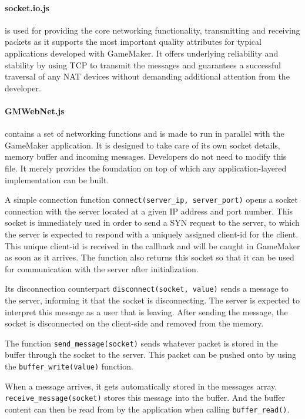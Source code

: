 \documentclass[bsc, 12pt, twoside, singlespacing, parskip, abbrevs, notimes, normalheadings, logo]{styles/infthesis}
\begin{document}
\paragraph*{socket.io.js}
is used for providing the core networking functionality, transmitting and receiving packets as it supports the most important quality attributes for typical applications developed with GameMaker. It offers underlying reliability and stability by using TCP to transmit the messages and guarantees a successful traversal of any NAT devices without demanding additional attention from the developer.

\paragraph*{GMWebNet.js}
contains a set of networking functions and is made to run in parallel with the GameMaker application. 
It is designed to take care of its own socket details, memory buffer and incoming messages. Developers do not need to modify this file. It merely provides the foundation on top of which any application-layered implementation can be built.

A simple connection function \texttt{connect(server\_ip, server\_port)} opens a socket connection with the server located at a given IP address and port number.
This socket is immediately used in order to send a SYN request to the server, to which the server is expected to respond with a uniquely assigned client-id for the client. This unique client-id is received in the callback and will be caught in GameMaker as soon as it arrives.
The function also returns this socket so that it can be used for communication with the server after initialization.

Its disconnection counterpart \texttt{disconnect(socket, value)} sends a message to the server, informing it that the socket is disconnecting. The server is expected to interpret this message as a user that is leaving.
After sending the message, the socket is disconnected on the client-side and removed from the memory.

The function \texttt{send\_message(socket)} sends whatever packet is stored in the buffer through the socket to the server.
This packet can be pushed onto by using the \texttt{buffer\_write(value)} function.

When a message arrives, it gets automatically stored in the messages array. \texttt{receive\_message(socket)} stores this message into the buffer. And the buffer content can then be read from by the application when calling \texttt{buffer\_read()}.
\end{document}
